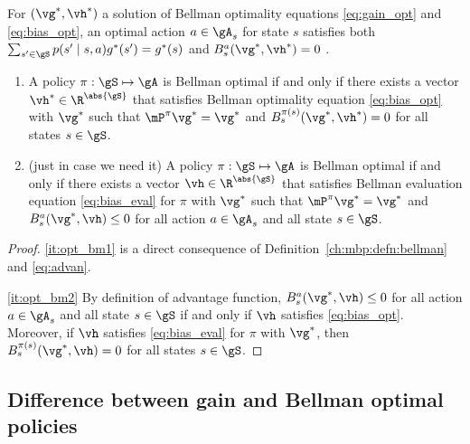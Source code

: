 For $(\vg^*,\vh^*)$ a solution of Bellman optimality equations \eqref{eq:gain_opt} and \eqref{eq:bias_opt}, %
an optimal action $a\in\gA_s$ for state $s$ satisfies both ${\sum_{s'\in\gS}p(s'\mid s,a)g^*(s')} =g^*(s)$ and $B^a_s(\vg^*,\vh^*)=0$ \cite{puterman2014markov, schweitzer1978functional}.

\begin{lem}
    \label{ch:mbp:lem:bellman_charac}
    \begin{enumerate}[label=(\roman*)]
        \item \label{it:opt_bm1} A policy $\pi:\gS\mapsto\gA$ is Bellman optimal if and only if there exists a vector $\vh^*\in\R^{\abs{\gS}}$ that satisfies Bellman optimality equation \eqref{eq:bias_opt} with $\vg^*$ such that $\mP^\pi\vg^*=\vg^*$ and $B^{\pi(s)}_s(\vg^*,\vh^*)=0$ for all states $s\in\gS$.

        \item \label{it:opt_bm2} (just in case we need it) A policy $\pi:\gS\mapsto\gA$ is Bellman optimal if and only if there exists a vector $\vh\in\R^{\abs{\gS}}$ that satisfies Bellman evaluation equation \eqref{eq:bias_eval} for $\pi$ with $\vg^*$ such that $\mP^\pi\vg^*=\vg^*$ and $B^a_s(\vg^*,\vh)\le0$ for all action $a\in\gA_s$ and all state $s\in\gS$.
        \end{enumerate}
\end{lem}
\begin{proof}
    \ref{it:opt_bm1} is a direct consequence of Definition~\ref{ch:mbp:defn:bellman} and \eqref{eq:advan}.

    \ref{it:opt_bm2} By definition of advantage function, $B^a_s(\vg^*,\vh)\le0$ for all action $a\in\gA_s$ and all state $s\in\gS$ if and only if $\vh$ satisfies \eqref{eq:bias_opt}.
    Moreover, if $\vh$ satisfies \eqref{eq:bias_eval} for $\pi$ with $\vg^*$, then $B^{\pi(s)}_s(\vg^*,\vh)=0$ for all states $s\in\gS$.
\end{proof}


\subsection{Difference between gain and Bellman optimal policies}
\label{ssec:gain_charac}

